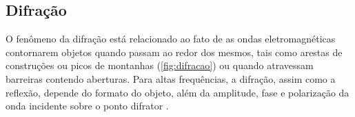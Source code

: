 \begin{figure}[H]
	\centering
\end{figure}

\subsection{Difração}
\label{sub:difracao}

O fenômeno da difração está relacionado ao fato de as ondas eletromagnéticas contornarem objetos quando passam ao redor dos mesmos, tais como arestas de construções ou picos de montanhas (\autoref{fig:difracao}) ou quando atravessam barreiras contendo aberturas. Para altas frequências, a difração, assim como a reflexão, depende do formato do objeto, além da amplitude, fase e polarização da onda incidente sobre o ponto difrator \cite{rappaport2009}.

\begin{figure}[H]
	\centering
\end{figure}

